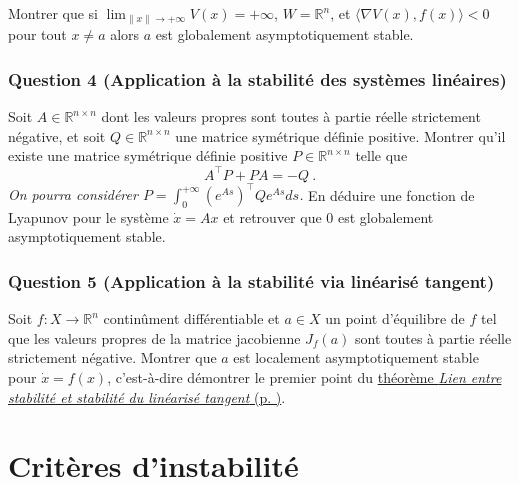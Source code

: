 
Montrer que si \(\lim_{\|x\|\to +\infty} V(x) = +\infty\),
\(W=\mathbb{R}^n\), et \(\langle\nabla V (x), f(x)\rangle < 0\) pour
tout \(x\neq a\) alors \(a\) est globalement asymptotiquement stable.

\hypertarget{lyap-4}{%
\subsubsection*{Question 4 (Application à la stabilité des systèmes
linéaires)}\label{lyap-4}}


Soit \(A\in \mathbb{R}^{n\times n}\) dont les valeurs propres sont
toutes à partie réelle strictement négative, et soit
\(Q\in \mathbb{R}^{n\times n}\) une matrice symétrique définie positive.
Montrer qu'il existe une matrice symétrique définie positive
\(P\in \mathbb{R}^{n\times n}\) telle que \[
A^\top P +P A = - Q \ .
\] \emph{On pourra considérer
\(P=\int_0^{+\infty}\left(e^{As}\right)^\top Q e^{As}ds\).} En déduire
une fonction de Lyapunov pour le système \(\dot{x} = Ax\) et retrouver
que \(0\) est globalement asymptotiquement stable.

\hypertarget{lyap-5}{%
\subsubsection*{Question 5 (Application à la stabilité via linéarisé
tangent)}\label{lyap-5}}


Soit \(f:X \to \mathbb{R}^n\) continûment différentiable et \(a\in X\)
un point d'équilibre de \(f\) tel que les valeurs propres de la matrice
jacobienne \(J_f(a)\) sont toutes à partie réelle strictement négative.
Montrer que \(a\) est localement asymptotiquement stable pour
\(\dot x = f(x)\), c'est-à-dire démontrer le premier point du
\protect\hyperlink{theo_linTangent}{théorème \emph{Lien entre stabilité
et stabilité du linéarisé tangent} (p. \pageref*{theo_linTangent})}.

\hypertarget{exo_instab}{%
\section{Critères d'instabilité}\label{exo_instab}}

